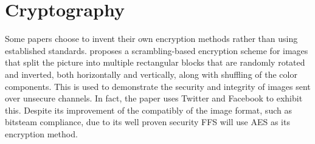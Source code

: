 \section{Cryptography}
Some papers choose to invent their own encryption methods rather than using established standards. \citeauthor{chumanEncryptionThenCompressionSystemsUsing2019} proposes a scrambling-based encryption scheme for images that split the picture into multiple rectangular blocks that are randomly rotated and inverted, both horizontally and vertically, along with shuffling of the color components\cite{chumanEncryptionThenCompressionSystemsUsing2019}. This is used to demonstrate the security and integrity of images sent over unsecure channels. In fact, the paper uses Twitter and Facebook to exhibit this. Despite its improvement of the compatibly of the image format, such as bitsteam compliance, due to its well proven security FFS will use AES as its encryption method. 